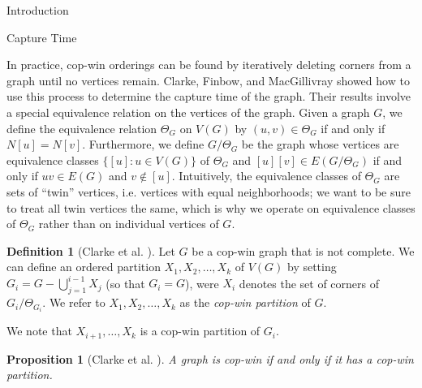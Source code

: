 \documentclass[12pt]{amsart}
\newcommand{\comment}[1]{\textcolor{red}{#1}}
\newtheorem{proposition}[lemma]{Proposition}
\theoremstyle{definition}
\newtheorem{definition}[lemma]{Definition}
\begin{document}
\begin{section}{Introduction}
\begin{section}{Capture Time}


In practice, cop-win orderings can be found by iteratively deleting corners from a graph until no vertices remain.  
Clarke, Finbow, and MacGillivray \cite{CFM14} showed how to use this process to determine the capture time of the graph.
Their results involve a special equivalence relation on the vertices of the graph.  Given a graph $G$, we define the equivalence relation $\Theta_G$ on $V(G)$ by $(u,v)\in \Theta_G$ if and only if $N[u]=N[v]$.  Furthermore, we define $G / \Theta_G$  be the graph whose vertices are equivalence classes $\{[u]:u\in V(G)\}$ of $\Theta_G$ and $[u][v]\in E(G / \Theta_G)$ if and only if $uv\in E(G)$ and $v\not\in[u]$.  Intuitively, the equivalence classes of $\Theta_G$ are sets of ``twin'' vertices, i.e. vertices with equal neighborhoods; we want to be sure to treat all twin vertices the same, which is why we operate on equivalence classes of $\Theta_G$ rather than on individual vertices of $G$.

\begin{definition}[Clarke et al. \cite{CFM14}]
    Let $G$ be a cop-win graph that is not complete.  We can define an ordered partition $X_1,X_2,\dots,X_k$ of $V(G)$ by setting $G_i=G-\bigcup_{j=1}^{i-1}X_j$ (so that $G_i=G$), were $X_i$ denotes the set of corners of $G_i / \Theta_{G_i}$. We refer to $X_1,X_2,\dots,X_k$ as the \textit{cop-win partition} of $G$.
\end{definition}

We note that $X_{i+1},\dots,X_k$ is a cop-win partition of $G_i$.

\begin{proposition}[Clarke et al. \cite{CFM14}]\label{prop:copwin_copwin_partition}
    A graph is cop-win if and only if it has a cop-win partition.
\end{proposition}


\end{section}
\end{section}
\end{document}
